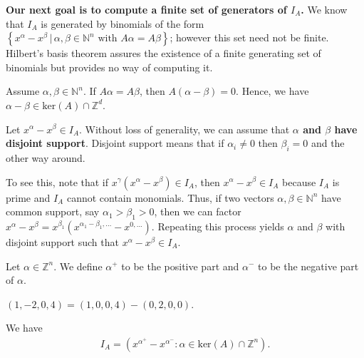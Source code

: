 \documentclass[a4paper, 11pt]{article}
\begin{document}
\textbf{Our next goal is to compute a finite set of generators of \( I_A \).} We know that \( I_A \) is generated by binomials of the form \( \left\{ 
  x^\alpha - x^\beta \, | \, \alpha, \beta \in \mathbb N^n \text{ with } A\alpha = A\beta
 \right\} \); however this set need not be finite. Hilbert's basis theorem assures the existence of a finite generating set of binomials but provides no way of computing it.

\begin{remark}
  Assume \( \alpha, \beta \in \mathbb N^n \). If \( A\alpha = A\beta \), then \( A(\alpha - \beta) = 0 \). Hence, we have \( \alpha - \beta \in \mathrm{ker}(A) \cap \mathbb Z^d \).
\end{remark}

\begin{remark}
  Let \( x^\alpha - x^\beta \in I_A \). Without loss of generality, we can assume that \textbf{\( \alpha \)  and \( \beta \) have disjoint support}. Disjoint support means that if \( \alpha_i \neq 0 \) then \( \beta_i = 0 \) and the other way around.

  To see this, note that if \( x^\gamma (x^\alpha - x^\beta) \in I_A \), then \( x^\alpha - x^\beta \in I_A \) because \( I_A \) is prime and \( I_A \) cannot contain monomials. Thus, if two vectors \( \alpha, \beta \in \mathbb N^n \) have common support, say \( \alpha_1 > \beta_1 > 0 \), then we can factor \( x^{\alpha} - x^\beta = x^{\beta_1}(x^{\alpha_1 - \beta_1,...} - x^{0,...}) \). Repeating this process yields \( \alpha \) and \( \beta \) with disjoint support such that \( x^\alpha - x^\beta \in I_A \).
\end{remark}

\begin{defi}
  Let \( \alpha \in \mathbb Z^n \). We define \( \alpha^+ \) to be the positive part and \( \alpha^- \) to be the negative part of \( \alpha \).
\end{defi}

\begin{eg}
  \( (1,-2,0,4) = (1,0,0,4) - (0,2,0,0) \).
\end{eg}

\begin{mdframed}
\begin{cor}
  We have 
  \begin{align*}
    I_A = (x^{\alpha^+} - x^{\alpha^-} : \alpha \in \mathrm{ker}(A) \cap \mathbb Z^n).
  \end{align*}
\end{cor}
\end{mdframed}
\end{document}
